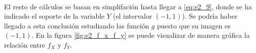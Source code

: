 \documentclass{article}
\begin{document}
    \paragraph{}
    El resto de cálculos se basan en simplifación hasta llegar a \eqref{eq:e2_9}, donde se ha indicado el soporte de la variable $Y$ (el intervalor $(-1,1)$). Se podría haber llegado a esta conclusión estudiando las función $g$ puesto que su imagen es $(-1,1)$. En la figura \ref{fig:e2_f_x_f_y} se puede visualizar de manera gráfica la relación entre $f_X$ y $f_Y$.

  \nocite{prob2017}

  
  
\end{document}
